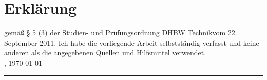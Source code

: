 \chapter*{Erklärung}
gemäß § 5 (3) der \glqq Studien- und Prüfungsordnung DHBW Technik\grqq vom 22. September 2011.
Ich habe die vorliegende Arbeit selbstständig verfasst und keine anderen als die angegebenen Quellen und Hilfsmittel verwendet.\\

\location, \today \\[4ex]
\rule[-0.2cm]{5cm}{0.5pt} \\
\textsc{\autor} \\[10ex]


%
%
%














